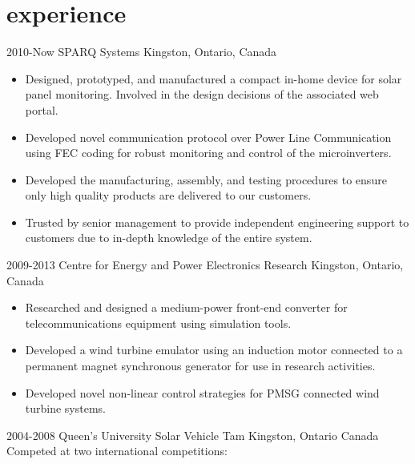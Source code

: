 
\section{experience}

\begin{entrylist}
\entry
  {2010-Now}
  {SPARQ Systems}
  {Kingston, Ontario, Canada}
  {
\begin{itemize}
\item Designed, prototyped, and manufactured a compact in-home device for solar panel monitoring. Involved in the design decisions of the associated web portal.
\item Developed novel communication protocol over Power Line Communication using FEC coding for robust monitoring and control of the microinverters.
\item Developed the manufacturing, assembly, and testing procedures to ensure only high quality products are delivered to our customers.
\item Trusted by senior management to provide independent engineering support to customers due to in-depth knowledge of the entire system.
\end{itemize}
}
\entry
  {2009-2013}
  {Centre for Energy and Power Electronics Research}
  {Kingston, Ontario, Canada}
  {
  \begin{itemize}
    \item Researched and designed a medium-power front-end converter for telecommunications equipment using simulation tools. 
    \item Developed a wind turbine emulator using an induction motor connected to a permanent magnet synchronous generator for use in research activities.
    \item Developed novel non-linear control strategies for PMSG connected wind turbine systems.
  \end{itemize}}
\entry
  {2004-2008}
  {Queen's University Solar Vehicle Tam}
  {Kingston, Ontario Canada}
  {\\
  Competed at two international competitions:
}
\end{entrylist}
